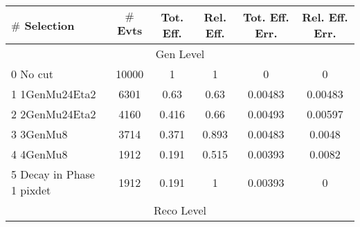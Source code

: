 \documentclass{article}
\begin{document}
\begin{table}
\centering
\small\addtolength{\tabcolsep}{+1pt}
\renewcommand{\arraystretch}{1.3}
\begin{tabular}{| l| c | c | c | c | c |}
 \hline
 $\#$   Selection                & $\#$ Evts    &  Tot. Eff.    &  Rel. Eff.    &  Tot. Eff. Err.  &  Rel. Eff. Err.  \\ \hline 
  \multicolumn{6}{|c|}{Gen Level} \\ \hline 

0  No cut                   & 10000       & 1             & 1             & 0                & 0            
\\ \hline 
 1  1GenMu24Eta2              & 6301        & 0.63          & 0.63          & 0.00483          & 0.00483          \\ \hline 
 2  2GenMu24Eta2              & 4160        & 0.416         & 0.66          & 0.00493          & 0.00597           \\ \hline 
 3  3GenMu8                  & 3714        & 0.371         & 0.893         & 0.00483          & 0.0048         \\ \hline 
 4  4GenMu8                  & 1912        & 0.191         & 0.515         & 0.00393          & 0.0082           \\ \hline 
 5  Decay in Phase 1 pixdet   & 1912        & 0.191         & 1             & 0.00393          & 0              \\ \hline 
  
\multicolumn{6}{|c|}{Reco Level} \\ \hline     
                                                                                                                

\end{tabular}
\end{table}
\end{document}

